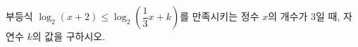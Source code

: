 부등식 $\log_2 (x+2)\le\log_2\left(\dfrac{1}{3}x+k\right)$를 만족시키는 정수 $x$의 개수가 $3$일 때, 자연수 $k$의 값을 구하시오.

